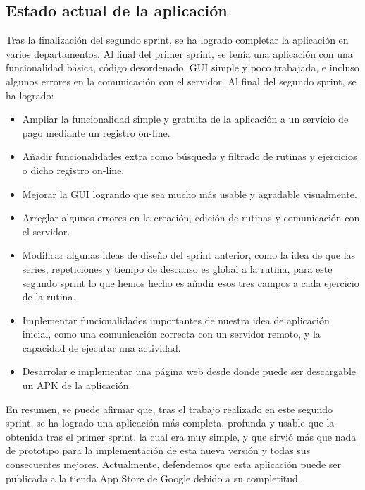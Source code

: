 \documentclass[11pt,a4paper]{report}
\begin{document}
\subsection{Estado actual de la aplicación}
Tras la finalización del segundo sprint, se ha logrado completar la aplicación en varios departamentos. Al final del primer sprint, se tenía una aplicación con una funcionalidad básica, código desordenado, GUI simple y poco trabajada, e incluso algunos errores en la comunicación con el servidor. Al final del segundo sprint, se ha logrado:
\begin{itemize}
	\item Ampliar la funcionalidad simple y gratuita de la aplicación a un servicio de pago mediante un registro on-line.

	\item Añadir funcionalidades extra como búsqueda y filtrado de rutinas y ejercicios o dicho registro on-line.

	\item Mejorar la GUI logrando que sea mucho más usable y agradable visualmente.

	\item Arreglar algunos errores en la creación, edición de rutinas y comunicación con el servidor.

	\item Modificar algunas ideas de diseño del sprint anterior, como la idea de que las series, repeticiones y tiempo de descanso es global a la rutina, para este segundo sprint lo que hemos hecho es añadir esos tres campos a cada ejercicio de la rutina.

	\item Implementar funcionalidades importantes de nuestra idea de aplicación inicial, como una comunicación correcta con un servidor remoto, y la capacidad de ejecutar una actividad.

	\item Desarrolar e implementar una página web desde donde puede ser descargable un APK de la aplicación.

\end{itemize}
En resumen, se puede afirmar que, tras el trabajo realizado en este segundo sprint, se ha logrado una aplicación más completa, profunda y usable que la obtenida tras el primer sprint, la cual era muy simple, y que sirvió más que nada de prototipo para la implementación de esta nueva versión y todas sus consecuentes mejores. Actualmente, defendemos que esta aplicación puede ser publicada a la tienda App Store de Google debido a su completitud.
\end{document}
